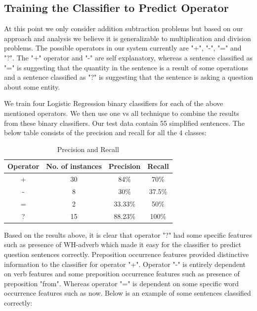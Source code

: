 \documentclass[11pt]{article}
\begin{document}
\subsection{Training the Classifier to Predict Operator}
At this point we only consider addition subtraction problems but based on our approach and analysis we believe it is generalizable to multiplication and division problems. The possible operators in our system currently are "+", "-", "=" and "?". The "+" operator and "-" are self explanatory, whereas a sentence classified as "=" is suggesting that the quantity in the sentence is a result of some operations and a sentence classified as "?" is suggesting that the sentence is asking a question about some entity.

We train four Logistic Regression binary classifiers for each of the above mentioned operators. We then use one vs all technique to combine the results from these binary classifiers. Our test data contain 55 simplified sentences. The below table consists of the precision and recall for all the 4 classes:

\begin{table}[h]
\begin{center}
\begin{tabular}{|c|c|c|c|}
\hline
\bf Operator & \bf No. of instances & \bf Precision & \bf Recall \\
\hline
+ & 30 & 84\% & 70\% \\
\hline
- & 8 & 30\% & 37.5\% \\
\hline
= & 2 & 33.33\% & 50\% \\
\hline
? & 15 & 88.23\% & 100\% \\
\hline
\end{tabular}
\end{center}
\caption{\label{precision-recall-table} Precision and Recall}
\end{table}

Based on the results above, it is clear that operator "?" had some specific features such as presence of WH-adverb which made it easy for the classifier to predict question sentences correctly. Preposition occurrence features provided distinctive information to the classifier for operator "+". Operator "-" is entirely dependent on verb features and some preposition occurrence features such as presence of preposition "from". Whereas operator "=" is dependent on some specific word occurrence features such as now. Below is an example of some sentences classified correctly:
\end{document}
